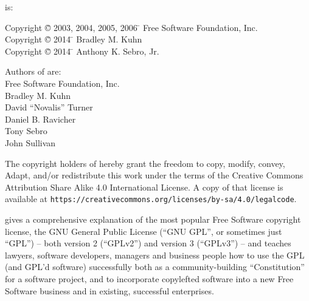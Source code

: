 \begin{center}

{\parindent 0in
 is: \\
\begin{tabbing}
Copyright \= \copyright{} 2003, 2004, 2005, 2006 \= \hspace{.2in} Free Software Foundation, Inc. \\
Copyright \= \copyright{} 2014 \= \hspace{.2in} Bradley M. Kuhn \\
Copyright \= \copyright{} 2014 \= \hspace{.2in} Anthony K. Sebro, Jr. \\
\end{tabbing}

Authors of  are: \\

Free Software Foundation, Inc. \\
Bradley M. Kuhn \\
David ``Novalis'' Turner \\
Daniel B. Ravicher \\
Tony Sebro \\
John Sullivan

\vspace{.3in}

The copyright holders of  hereby grant the freedom to copy, modify,
convey, Adapt, and/or redistribute this work under the terms of the Creative
Commons Attribution Share Alike 4.0 International License.  A copy of that
license is available at
\verb=https://creativecommons.org/licenses/by-sa/4.0/legalcode=.  }

\end{center}

\bigskip

\bigskip

 gives a
comprehensive explanation of the most popular Free Software copyright
license, the GNU General Public License (``GNU GPL'', or sometimes just
``GPL'') -- both version 2 (``GPLv2'') and version 3 (``GPLv3'') -- and
teaches lawyers, software developers, managers and business people how to use
the GPL (and GPL'd software) successfully both as a community-building
``Constitution'' for a software project, and to incorporate copylefted
software into a new Free Software business and in existing, successful
enterprises.

